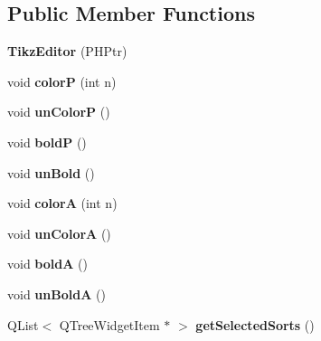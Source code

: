 \subsection*{Public Member Functions}
\begin{DoxyCompactItemize}
\item 
\hypertarget{classTikzEditor_ae20e40bc525c2a88f40ddeaf8912954a}{{\bfseries Tikz\+Editor} (P\+H\+Ptr)}\label{classTikzEditor_ae20e40bc525c2a88f40ddeaf8912954a}

\item 
\hypertarget{classTikzEditor_a420664816145a314d10c185e7d63f171}{void {\bfseries color\+P} (int n)}\label{classTikzEditor_a420664816145a314d10c185e7d63f171}

\item 
\hypertarget{classTikzEditor_a8dee3435962ad4b3433aadb68c178fc7}{void {\bfseries un\+Color\+P} ()}\label{classTikzEditor_a8dee3435962ad4b3433aadb68c178fc7}

\item 
\hypertarget{classTikzEditor_a1e9ba2903ee5a6a871ab49e088f895f8}{void {\bfseries bold\+P} ()}\label{classTikzEditor_a1e9ba2903ee5a6a871ab49e088f895f8}

\item 
\hypertarget{classTikzEditor_a39601f696d0bc11462df86a097460609}{void {\bfseries un\+Bold} ()}\label{classTikzEditor_a39601f696d0bc11462df86a097460609}

\item 
\hypertarget{classTikzEditor_a0176d4902997a92cdad5ab7b1da88d5b}{void {\bfseries color\+A} (int n)}\label{classTikzEditor_a0176d4902997a92cdad5ab7b1da88d5b}

\item 
\hypertarget{classTikzEditor_a4c7ff53f9d3562091ea898be1d52bbb7}{void {\bfseries un\+Color\+A} ()}\label{classTikzEditor_a4c7ff53f9d3562091ea898be1d52bbb7}

\item 
\hypertarget{classTikzEditor_ab2cc315d0bbbb9a5a0c5c9f44563656c}{void {\bfseries bold\+A} ()}\label{classTikzEditor_ab2cc315d0bbbb9a5a0c5c9f44563656c}

\item 
\hypertarget{classTikzEditor_ad0dc1c98cfab8947bcbd4fd3f1a337e0}{void {\bfseries un\+Bold\+A} ()}\label{classTikzEditor_ad0dc1c98cfab8947bcbd4fd3f1a337e0}

\item 
\hypertarget{classTikzEditor_a06ab6cec4b0b8f32b3f3bb6507b53f88}{Q\+List$<$ Q\+Tree\+Widget\+Item $\ast$ $>$ {\bfseries get\+Selected\+Sorts} ()}\label{classTikzEditor_a06ab6cec4b0b8f32b3f3bb6507b53f88}


\end{DoxyCompactItemize}
